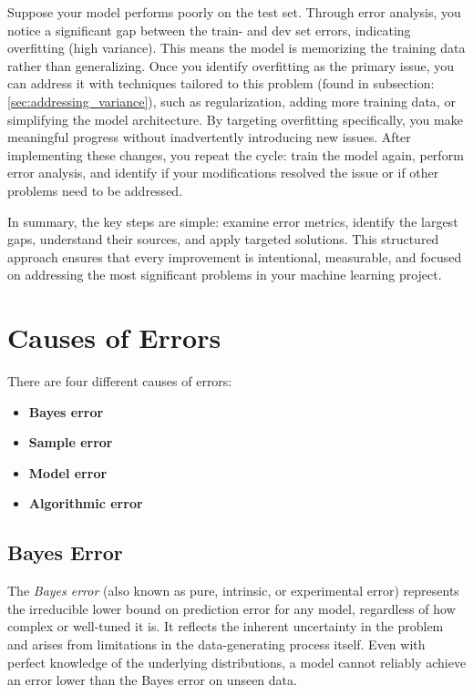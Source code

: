 \documentclass[12pt,openany]{book}
\begin{document}
\begin{examplebox}
Suppose your model performs poorly on the test set. Through error analysis, you notice a significant gap between the train- and dev set errors, indicating overfitting (high variance). This means the model is memorizing the training data rather than generalizing. Once you identify overfitting as the primary issue, you can address it with techniques tailored to this problem (found in subsection: \ref{sec:addressing_variance}), such as regularization, adding more training data, or simplifying the model architecture. By targeting overfitting specifically, you make meaningful progress without inadvertently introducing new issues. After implementing these changes, you repeat the cycle: train the model again, perform error analysis, and identify if your modifications resolved the issue or if other problems need to be addressed.
\end{examplebox}

In summary, the key steps are simple: examine error metrics, identify the largest gaps, understand their sources, and apply targeted solutions. This structured approach ensures that every improvement is intentional, measurable, and focused on addressing the most significant problems in your machine learning project.



\section{Causes of Errors}

There are four different causes of errors:
\begin{itemize}
    \item \textbf{Bayes error}
    \item \textbf{Sample error}
    \item \textbf{Model error}
    \item \textbf{Algorithmic error}
\end{itemize}


\subsection{Bayes Error}  \label{subsec:Bayes_error}

The \textit{Bayes error} (also known as pure, intrinsic, or experimental error) represents the irreducible lower bound on prediction error for any model, regardless of how complex or well-tuned it is. It reflects the inherent uncertainty in the problem and arises from limitations in the data-generating process itself. Even with perfect knowledge of the underlying distributions, a model cannot reliably achieve an error lower than the Bayes error on unseen data. \newline
\end{document}
